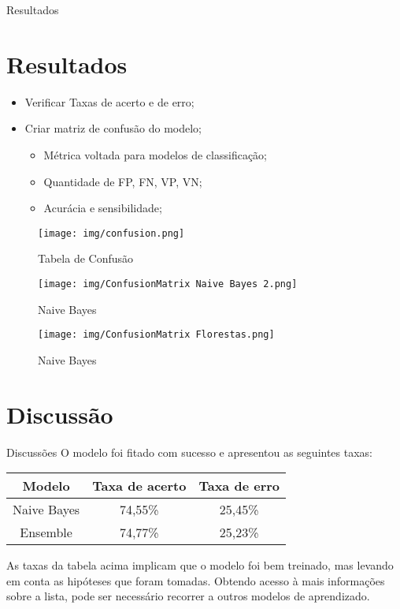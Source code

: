 \documentclass[compress]{beamer}
\begin{document}
\begin{frame}{Resultados}
\section{Resultados}
\begin{itemize}
    \item Verificar Taxas de acerto e de erro;
    \item Criar matriz de confusão do modelo;
    \begin{itemize}
        \item Métrica voltada para modelos de classificação;
        \item Quantidade de FP, FN, VP, VN;
        \item Acurácia e sensibilidade;
    \end{itemize}
\end{itemize}
\begin{figure}
    \centering
    \texttt{[image: img/confusion.png]}
    \caption{Tabela de Confusão}
    \label{fig:confusion}
\end{figure}
\end{frame}
\begin{frame}
    \begin{figure}
        \centering
        \texttt{[image: img/ConfusionMatrix Naive Bayes 2.png]}
        \caption{Naive Bayes}
        \label{fig:my_label}
    \end{figure}
\end{frame}

\begin{frame}
    \begin{figure}
        \centering
        \texttt{[image: img/ConfusionMatrix Florestas.png]}
        \caption{Naive Bayes}
        \label{fig:my_label}
    \end{figure}
\end{frame}

\section{Discussão}
\begin{frame}{Discussões}
    O modelo foi fitado com sucesso e apresentou as seguintes taxas:
    \begin{table}[h!]
        \centering
        \begin{tabular}{|c|c|c|}
            \hline
            Modelo &  Taxa de acerto & Taxa de erro\\
            \hline
            Naive Bayes & 74,55\%&  25,45\%\\
            \hline
            Ensemble & 74,77\% &25,23\%\\
            \hline
        \end{tabular}
    \end{table}
    
    As taxas da tabela acima implicam que o modelo foi bem treinado, mas levando em conta as hipóteses que foram tomadas. Obtendo acesso à mais informações sobre a lista, pode ser necessário recorrer a outros modelos de aprendizado.
\end{frame}
\end{document}
